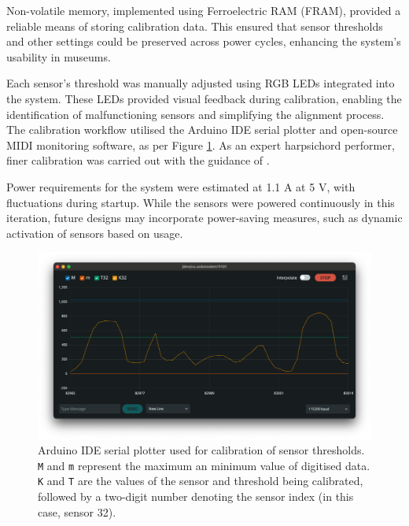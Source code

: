Non-volatile memory, implemented using Ferroelectric RAM (FRAM), provided a reliable means of storing calibration data. This ensured that sensor thresholds and other settings could be preserved across power cycles, enhancing the system's usability in museums.


Each sensor's threshold was manually adjusted using RGB LEDs integrated into the system. These LEDs provided visual feedback during calibration, enabling the identification of malfunctioning sensors and simplifying the alignment process. The calibration workflow utilised the Arduino IDE serial plotter and open-source MIDI monitoring software, as per Figure \ref{fig:serial_monitor}. As an expert harpsichord performer, finer calibration was carried out with the guidance of .


Power requirements for the system were estimated at 1.1 A at 5 V, with fluctuations during startup. While the sensors were powered continuously in this iteration, future designs may incorporate power-saving measures, such as dynamic activation of sensors based on usage.


\begin{figure}
    \centering
    \includegraphics[width=\linewidth]{src/images/serial_monitor.png}
    \caption{Arduino IDE serial plotter used for calibration of sensor thresholds. \texttt{M} and \texttt{m} represent the maximum an minimum value of digitised data. \texttt{K} and \texttt{T} are the values of the sensor and threshold being calibrated, followed by a two-digit number denoting the sensor index (in this case, sensor 32).}
    \label{fig:serial_monitor}
\end{figure}

